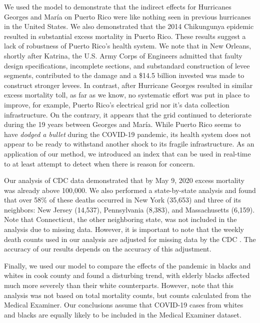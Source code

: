 \documentclass[11pt]{article}
\begin{document}
We used the model to demonstrate that the indirect effects for Hurricanes Georges and Mar\'ia on Puerto Rico were like nothing seen in previous hurricanes in the United States. We also demonstrated that the 2014 Chikungunya epidemic resulted in substantial excess mortality in Puerto Rico. These results suggest a lack of robustness of Puerto Rico's health system. We note that in New Orleans, shortly after Katrina, the U.S. Army Corps of Engineers admitted that faulty design specifications, incomplete sections, and substandard construction of levee segments, contributed to the damage and a \$14.5 billion invested was made to construct stronger levees. In contrast, after Hurricane Georges resulted in similar excess mortality toll, as far as we know, no systematic effort was put in place to improve, for example, Puerto Rico’s electrical grid nor it's data collection infrastructure. On the contrary, it appears that the grid continued to deteriorate during the 19 years between Georges and Mar\'ia. While Puerto Rico seems to have \emph{dodged a bullet} during the COVID-19 pandemic, its health system does not appear to be ready to withstand another shock to its fragile infrastructure. As an application of our method, we introduced an index that can be used in real-time to at least attempt to detect when there is reason for concern. 

Our analysis of CDC data demonstrated that by May 9, 2020 excess mortality was already above 100,000. We also performed a state-by-state analysis and found that over 58\% of these deaths occurred in New York (35,653) and three of its neighbors: New Jersey (14,537), Pennsylvania (8,383), and Massachusetts (6,159). Note that Connecticut, the other neighboring state, was not included in the analysis due to missing data. However, it is important to note that the weekly death counts used in our analysis are adjusted for missing data by the CDC \cite{cdc2020covid19}. The accuracy of our results depends on the accuracy of this adjustment. 

Finally, we used our model to compare the effects of the pandemic in blacks and whites in cook county and found a disturbing trend, with elderly blacks affected much more severely than their white counterparts. However, note that this analysis was not based on total mortality counts, but counts calculated from the Medical Examiner. Our conclusions assume that COVID-19 cases from whites and blacks are equally likely to be included in the Medical Examiner dataset. 
\end{document}
